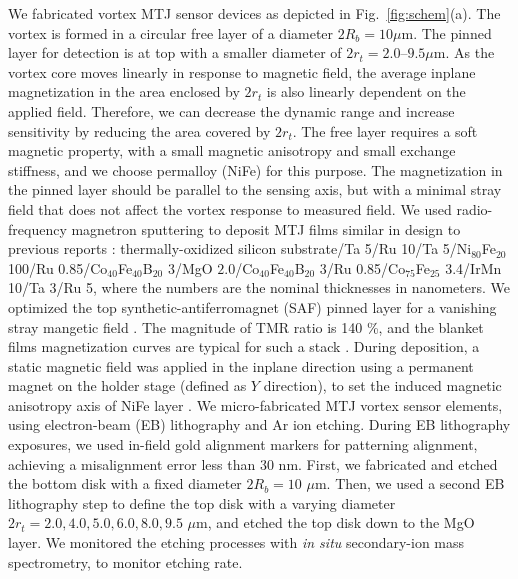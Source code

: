\documentclass[10pt]{iopart}
\begin{document}
    We fabricated vortex MTJ sensor devices as depicted in Fig.~\ref{fig:schem}(a).
    The vortex is formed in a circular free layer of a diameter {$2R_b = 10\mu$m}. The pinned layer for detection is at top with a smaller diameter of {$2 r_t = 2.0$--$9.5\mu$m}. As the vortex core moves linearly in response to magnetic field, the average inplane magnetization in the area enclosed by $2 r_t$ is also linearly dependent on the applied field. Therefore, we can decrease the dynamic range and increase sensitivity by reducing the area covered by $2 r_t$. The free layer requires a soft magnetic property, with a small magnetic anisotropy and small exchange stiffness, and we choose permalloy (NiFe) for this purpose. The magnetization in the pinned layer should be parallel to the sensing axis, but with a minimal stray field that does not affect the vortex response to measured field.
    We used radio-frequency magnetron sputtering to deposit MTJ films similar in design to previous reports \cite{fujiwara_2012_13}: thermally-oxidized silicon substrate/Ta 5/Ru 10/Ta 5/Ni$_{80}$Fe$_{20}$ 100/Ru 0.85/Co$_{40}$Fe$_{40}$B$_{20}$ 3/MgO $2.0$/Co$_{40}$Fe$_{40}$B$_{20}$ 3/Ru 0.85/Co$_{75}$Fe$_{25}$ 3.4/IrMn 10/Ta 3/Ru 5, where the numbers are the nominal thicknesses in nanometers. We optimized the top synthetic-antiferromagnet (SAF) pinned layer for a vanishing stray mangetic field \cite{NoteSupp}. The magnitude of TMR ratio is 140 \%, and the blanket films magnetization curves are typical for such a stack \cite{NoteSupp,fujiwara_2012_13}. During deposition, a static magnetic field was applied in the inplane direction using a permanent magnet on the holder stage {(defined as $Y$ direction)}, to set the induced magnetic anisotropy axis of NiFe layer \cite{NoteSupp, katada_2000,chikazumi_1955}. We micro-fabricated MTJ vortex sensor elements, using electron-beam (EB) lithography and Ar ion etching. During EB lithography exposures, we used in-field gold alignment markers for patterning alignment, {achieving a misalignment error less than 30 nm}. First, we fabricated and etched the bottom disk with a fixed diameter $2R_b = 10$ $\mu\mathrm{m}$.
    Then, we used a second EB lithography step to define the top disk with a varying diameter {$2 r_t = 2.0, 4.0, 5.0, 6.0, 8.0, 9.5$ $\mu\mathrm{m}$}, and etched the top disk down to the MgO layer.
    We monitored the etching processes with \emph{in situ} secondary-ion mass spectrometry, to monitor etching rate.
\end{document}
